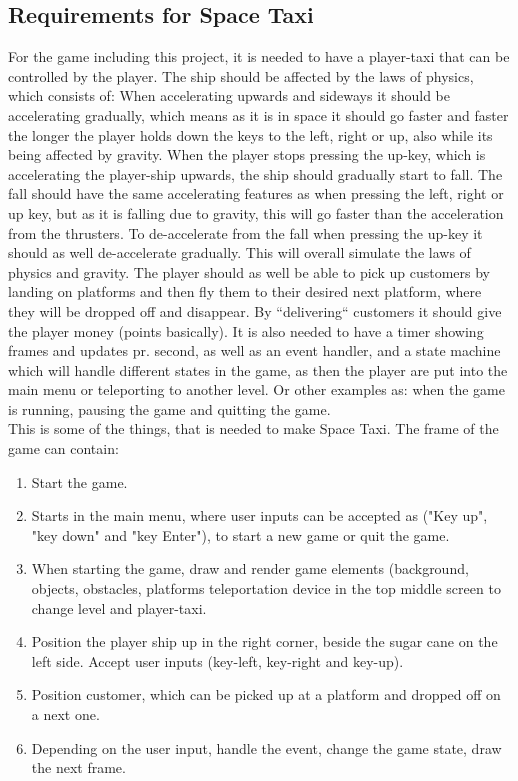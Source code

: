 \documentclass[../master.tex]{subfile}
\begin{document}
\subsection{Requirements for Space Taxi}
\label{sec:Requirements}
For the game including this project, it is needed to have a player-taxi that can be controlled by the player. The ship should be affected by the laws of physics, which consists of: When accelerating upwards and sideways it should be accelerating gradually, which means as it is in space it should go faster and faster the longer the player holds down the keys to the left, right or up, also while its being affected by gravity. When the player stops pressing the up-key, which is accelerating the player-ship upwards, the ship should gradually start to fall. The fall should have the same accelerating features as when pressing the left, right or up key, but as it is falling due to gravity, this will go faster than the acceleration from the thrusters. To de-accelerate from the fall when pressing the up-key it should as well de-accelerate gradually. This will overall simulate the laws of physics and gravity. The player should as well be able to pick up customers by landing on platforms and then fly them to their desired next platform, where they will be dropped off and disappear. By ``delivering`` customers it should give the player money (points basically). It is also needed to have a timer showing frames and updates pr. second, as well as an event handler, and a state machine which will handle different states in the game, as then the player are put into the main menu or teleporting to another level. Or other examples as: when the game is running, pausing the game and quitting the game.\\

This is some of the things, that is needed to make Space Taxi. The frame of the game can contain:
\begin{enumerate}
	\item Start the game.
	\item Starts in the main menu, where user inputs can be accepted as ("Key up", "key down" and "key Enter"), to start a new game or quit the game.
	\item When starting the game, draw and render game elements (background, objects, obstacles, platforms teleportation device in the top middle screen to change level and player-taxi.
	\item Position the player ship up in the right corner, beside the sugar cane on the left side. Accept user inputs (key-left, key-right and key-up).
    \item Position customer, which can be picked up at a platform and dropped off on a next one.
	\item Depending on the user input, handle the event, change the game state, draw the next frame.
\end{enumerate}
\end{document}
